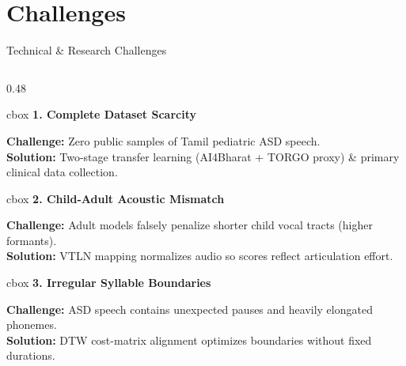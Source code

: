 \documentclass[aspectratio=169, 11pt, xcolor=table]{beamer}
\begin{document}
\section{Challenges}
\begin{frame}{Technical \& Research Challenges}
    \vspace{-3mm}
    
    \begin{columns}[T]
        \begin{column}{0.48\textwidth}
            
            \begin{beamercolorbox}[wd=\linewidth, sep=3pt, rounded=true]{cbox}
                \textbf{\textcolor{amritaMaroon}{\footnotesize 1. Complete Dataset Scarcity}} \\[1mm]
                {\scriptsize \textbf{Challenge:} Zero public samples of Tamil pediatric ASD speech.\\
                \textbf{Solution:} Two-stage transfer learning (AI4Bharat + TORGO proxy) \& primary clinical data collection.\par}
            \end{beamercolorbox}
            \vspace{2mm}
            
            \begin{beamercolorbox}[wd=\linewidth, sep=3pt, rounded=true]{cbox}
                \textbf{\textcolor{amritaMaroon}{\footnotesize 2. Child-Adult Acoustic Mismatch}} \\[1mm]
                {\scriptsize \textbf{Challenge:} Adult models falsely penalize shorter child vocal tracts (higher formants).\\
                \textbf{Solution:} VTLN mapping normalizes audio so scores reflect articulation effort.\par}
            \end{beamercolorbox}
            \vspace{2mm}
            
            \begin{beamercolorbox}[wd=\linewidth, sep=3pt, rounded=true]{cbox}
                \textbf{\textcolor{amritaMaroon}{\footnotesize 3. Irregular Syllable Boundaries}} \\[1mm]
                {\scriptsize \textbf{Challenge:} ASD speech contains unexpected pauses and heavily elongated phonemes.\\
                \textbf{Solution:} DTW cost-matrix alignment optimizes boundaries without fixed durations.\par}
            \end{beamercolorbox}
            

\end{column}
\end{columns}
\end{frame}
\end{document}
